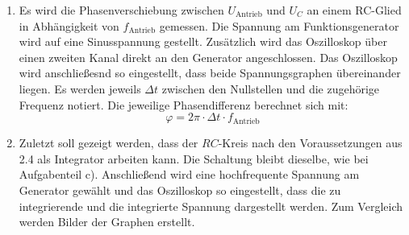 \begin{enumerate}
    \item Es wird die Phasenverschiebung zwischen $U_{\text{Antrieb}}$ und $U_C$ an einem
    RC-Glied in Abhängigkeit von $f_{\text{Antrieb}}$ gemessen. Die Spannung am
    Funktionsgenerator wird auf eine Sinusspannung gestellt.
     Zusätzlich wird das Oszilloskop über einen zweiten Kanal direkt an den Generator angeschlossen.
     Das Oszilloskop wird anschließesnd so eingestellt, dass beide Spannungsgraphen
      übereinander liegen. Es werden jeweils $\Delta t$ zwischen den Nullstellen
      und die zugehörige Frequenz notiert. Die jeweilige
       Phasendifferenz berechnet sich mit:
       \begin{equation}
         \varphi = 2 \pi \cdot \Delta t \cdot f_{\text{Antrieb}}
       \end{equation}


       \item Zuletzt soll gezeigt werden, dass der $RC$-Kreis nach den Voraussetzungen aus 2.4 als
       Integrator arbeiten kann. Die Schaltung bleibt dieselbe, wie bei Aufgabenteil c).
       Anschließend wird eine hochfrequente Spannung am Generator gewählt und das Oszilloskop so eingestellt, dass
       die zu integrierende und die integrierte Spannung dargestellt werden. Zum Vergleich werden
       Bilder der Graphen erstellt.



\end{enumerate}
